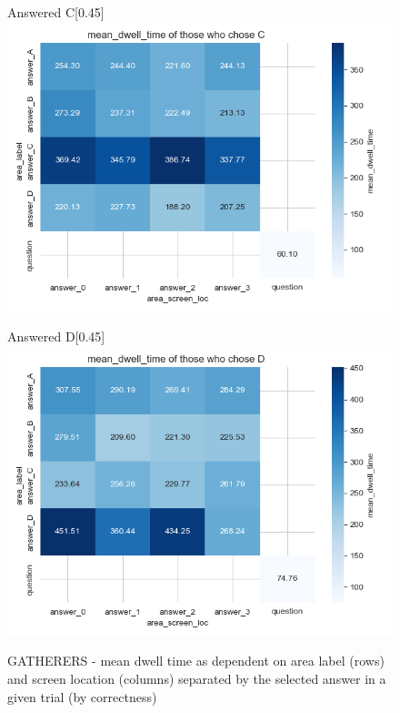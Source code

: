 \documentclass[manuscript,review,anonymous]{acmart}
\begin{document}
\begin{figure}[htbp]
          \medskip
        
          \begin{subcaptionbox}{Answered C\label{fig:C6}}[0.45\textwidth]
            {\centering\includegraphics[width=\linewidth]{plots/matrix_plots/matrix_mean_dwell_time_C_gatherers.png}}
          \end{subcaptionbox}
          \hfill
          \begin{subcaptionbox}{Answered D\label{fig:D6}}[0.45\textwidth]
            {\centering\includegraphics[width=\linewidth]{plots/matrix_plots/matrix_mean_dwell_time_D_gatherers.png}}
          \end{subcaptionbox}
          
          \caption{GATHERERS - mean dwell time as dependent on area label (rows) and screen location (columns) separated by the selected answer in a given trial (by correctness)}
          \label{fig:gath_dwell}
        \end{figure}
\end{document}

